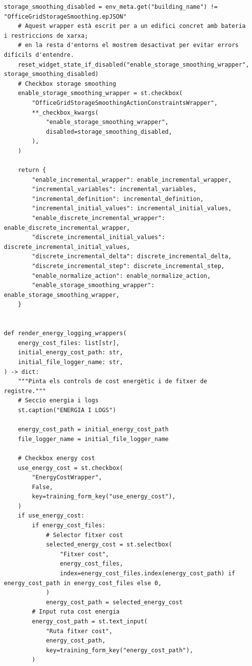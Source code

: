 \documentclass[10pt,a4paper]{article}
\begin{document}
\begin{lstlisting}[style=studioPython,caption={page\_components/training\_wrappers.py},label={lst:page-components-training-wrappers-py}]
    storage_smoothing_disabled = env_meta.get("building_name") != "OfficeGridStorageSmoothing.epJSON"
    # Aquest wrapper està escrit per a un edifici concret amb bateria i restriccions de xarxa;
    # en la resta d'entorns el mostrem desactivat per evitar errors difícils d'entendre.
    reset_widget_state_if_disabled("enable_storage_smoothing_wrapper", storage_smoothing_disabled)
    # Checkbox storage smoothing
    enable_storage_smoothing_wrapper = st.checkbox(
        "OfficeGridStorageSmoothingActionConstraintsWrapper",
        **_checkbox_kwargs(
            "enable_storage_smoothing_wrapper",
            disabled=storage_smoothing_disabled,
        ),
    )

    return {
        "enable_incremental_wrapper": enable_incremental_wrapper,
        "incremental_variables": incremental_variables,
        "incremental_definition": incremental_definition,
        "incremental_initial_values": incremental_initial_values,
        "enable_discrete_incremental_wrapper": enable_discrete_incremental_wrapper,
        "discrete_incremental_initial_values": discrete_incremental_initial_values,
        "discrete_incremental_delta": discrete_incremental_delta,
        "discrete_incremental_step": discrete_incremental_step,
        "enable_normalize_action": enable_normalize_action,
        "enable_storage_smoothing_wrapper": enable_storage_smoothing_wrapper,
    }


def render_energy_logging_wrappers(
    energy_cost_files: list[str],
    initial_energy_cost_path: str,
    initial_file_logger_name: str,
) -> dict:
    """Pinta els controls de cost energètic i de fitxer de registre."""
    # Seccio energia i logs
    st.caption("ENERGIA I LOGS")

    energy_cost_path = initial_energy_cost_path
    file_logger_name = initial_file_logger_name

    # Checkbox energy cost
    use_energy_cost = st.checkbox(
        "EnergyCostWrapper",
        False,
        key=training_form_key("use_energy_cost"),
    )
    if use_energy_cost:
        if energy_cost_files:
            # Selector fitxer cost
            selected_energy_cost = st.selectbox(
                "Fitxer cost",
                energy_cost_files,
                index=energy_cost_files.index(energy_cost_path) if energy_cost_path in energy_cost_files else 0,
            )
            energy_cost_path = selected_energy_cost
        # Input ruta cost energia
        energy_cost_path = st.text_input(
            "Ruta fitxer cost",
            energy_cost_path,
            key=training_form_key("energy_cost_path"),
        )


\end{lstlisting}
\end{document}
